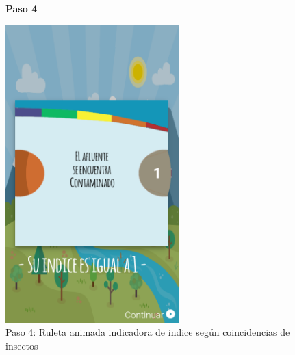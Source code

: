 				\begin{figure}[H]
					\centering
					\textbf{Paso 4}\par\medskip
						\includegraphics[width=0.6\textwidth]{Screenshots/ruedita.png}
						\caption{Paso 4: Ruleta animada indicadora de indice según coincidencias de insectos}
				\end{figure}

